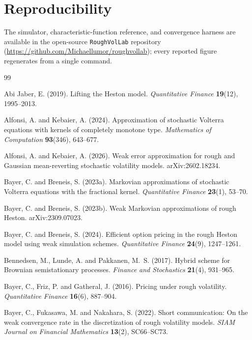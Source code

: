 \documentclass{ws-ijtaf}
\begin{document}
\section*{Reproducibility}
The simulator, characteristic-function reference, and convergence harness are available in
the open-source \texttt{RoughVolLab} repository
(\url{https://github.com/Michaellumor/roughvollab}); every reported figure regenerates from
a single command.

\begin{thebibliography}{99}

 Abi Jaber, E. (2019).
Lifting the Heston model. \emph{Quantitative Finance} \textbf{19}(12), 1995--2013.

 Alfonsi, A. and Kebaier, A. (2024).
Approximation of stochastic Volterra equations with kernels of completely
monotone type. \emph{Mathematics of Computation} \textbf{93}(346), 643--677.

 Alfonsi, A. and Kebaier, A. (2026).
Weak error approximation for rough and Gaussian mean-reverting stochastic
volatility models. arXiv:2602.18234.

 Bayer, C. and Breneis, S. (2023a).
Markovian approximations of stochastic Volterra equations with the fractional kernel.
\emph{Quantitative Finance} \textbf{23}(1), 53--70.

 Bayer, C. and Breneis, S. (2023b).
Weak Markovian approximations of rough Heston. arXiv:2309.07023.

 Bayer, C. and Breneis, S. (2024).
Efficient option pricing in the rough Heston model using weak simulation schemes.
\emph{Quantitative Finance} \textbf{24}(9), 1247--1261.

 Bennedsen, M., Lunde, A. and Pakkanen, M.~S. (2017).
Hybrid scheme for Brownian semistationary processes.
\emph{Finance and Stochastics} \textbf{21}(4), 931--965.

 Bayer, C., Friz, P. and Gatheral, J. (2016).
Pricing under rough volatility.
\emph{Quantitative Finance} \textbf{16}(6), 887--904.

 Bayer, C., Fukasawa, M. and Nakahara, S. (2022).
Short communication: On the weak convergence rate in the discretization of
rough volatility models. \emph{SIAM Journal on Financial Mathematics} \textbf{13}(2), SC66--SC73.


\end{thebibliography}
\end{document}
